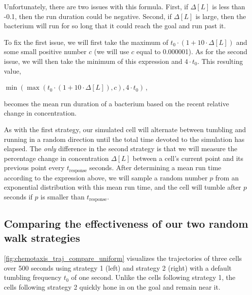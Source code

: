 Unfortunately, there are two issues with this formula. First, if $\Delta[L]$ is less than -0.1, then the run duration could be negative. Second, if $\Delta[L]$ is large, then the bacterium will run for so long that it could reach the goal and run past it.

To fix the first issue, we will first take the maximum of $t_0 \cdot (1 + 10 \cdot \Delta [L])$ and some small positive number $c$ (we will use $c$ equal to 0.000001). As for the second issue, we will then take the minimum of this expression and $4 \cdot t_0$. This resulting value,

\begin{center}
$\min\left(\max(t_0 \cdot (1 + 10 \cdot \Delta [L]), c), 4 \cdot t_0\right)$\,,
\end{center}

\noindent becomes the mean run duration of a bacterium based on the recent relative change in concentration.\\

\begin{qbox}\end{qbox}

As with the first strategy, our simulated cell will alternate between tumbling and running in a random direction until the total time devoted to the simulation has elapsed. The \textit{only} difference in the second strategy is that we will measure the percentage change in concentration $\Delta [L]$ between a cell's current point and its previous point every $t_{\text{response}}$ seconds. After determining a mean run time according to the expression above, we will sample a random number $p$ from an exponential distribution with this mean run time, and the cell will tumble after $p$ seconds if $p$ is smaller than $t_{\text{response}}$.

\FloatBarrier
{}
\subsection{Comparing the effectiveness of our two random walk strategies}

\autoref{fig:chemotaxis_traj_compare_uniform} visualizes the trajectories of three cells over 500 seconds using strategy 1 (left) and strategy 2 (right) with a default tumbling frequency $t_0$ of one second. Unlike the cells following strategy 1, the cells following strategy 2 quickly hone in on the goal and remain near it.\\

